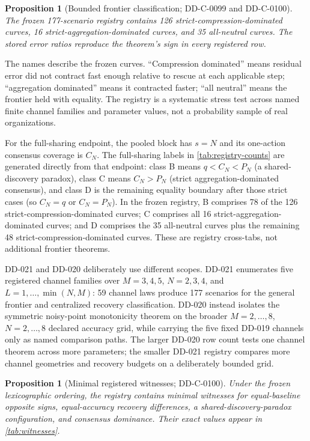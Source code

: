 \documentclass[12pt]{article}
\newtheorem{proposition}[theorem]{Proposition}
\theoremstyle{definition}
\begin{document}
\begin{proposition}[Bounded frontier classification; DD-C-0099 and DD-C-0100]
The frozen 177-scenario registry contains 126 strict-compression-dominated
curves, 16 strict-aggregation-dominated curves, and 35 all-neutral curves. The
stored error ratios reproduce the theorem's sign in every registered row.
\end{proposition}




The names describe the frozen curves. ``Compression dominated'' means residual
error did not contract fast enough relative to rescue at each applicable step;
``aggregation dominated'' means it contracted faster; ``all neutral'' means the
frontier held with equality. The registry is a systematic stress test across
named finite channel families and parameter values, not a probability sample of
real organizations.

For the full-sharing endpoint, the pooled block has $s=N$ and its one-action
consensus coverage is $C_N$. The full-sharing labels in
\cref{tab:registry-counts} are generated directly from that endpoint: class B
means $q<C_N<P_N$ (a shared-discovery paradox), class C means $C_N>P_N$
(strict aggregation-dominated consensus), and class D is the remaining
equality boundary after those strict cases (so $C_N=q$ or $C_N=P_N$). In the
frozen registry, B comprises 78 of the 126 strict-compression-dominated curves;
C comprises all 16 strict-aggregation-dominated curves; and D comprises the 35
all-neutral curves plus the remaining 48 strict-compression-dominated curves.
These are registry cross-tabs, not additional frontier theorems.

DD-021 and DD-020 deliberately use different scopes. DD-021 enumerates five
registered channel families over $M=3,4,5$, $N=2,3,4$, and
$L=1,\ldots,\min(N,M)$: 59 channel laws produce 177 scenarios for the general
frontier and centralized recovery classification. DD-020 instead isolates the
symmetric noisy-point monotonicity theorem on the broader $M=2,\ldots,8$,
$N=2,\ldots,8$ declared accuracy grid, while carrying the five fixed DD-019
channels only as named comparison paths. The larger DD-020 row count tests one
channel theorem across more parameters; the smaller DD-021 registry compares
more channel geometries and recovery budgets on a deliberately bounded grid.

\begin{proposition}[Minimal registered witnesses; DD-C-0100]
Under the frozen lexicographic ordering, the registry contains minimal witnesses
for equal-baseline opposite signs, equal-accuracy recovery differences, a
shared-discovery-paradox configuration, and consensus dominance. Their exact
values appear in \cref{tab:witnesses}.
\end{proposition}
\end{document}
